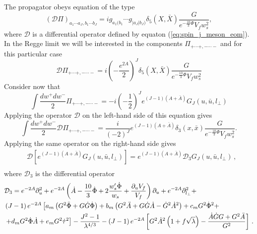 \documentclass[a4paper,12pt]{article}
\begin{document}
The propagator obeys equation of the type
\begin{equation}
\left(\mathcal{D} \Pi\right)_{a_1 \cdots a_J, b_1 \cdots b_J} = i g_{a_1(b_1} \cdots g_{|a_J|b_J)} \delta_5 \left(X, \bar{X}\right) \frac{G}{e^{-\frac{10}{3}\Phi}V_f w_s^2},
\end{equation}
where $\mathcal{D}$ is a differential operator defined by equaton (\ref{eq:spin_j_meson_eom}).
In the Regge limit we will be interested in the components $\Pi_{+\cdots+,-\cdots-}$ and for this particular case
\begin{equation}
\mathcal{D} \Pi_{+\cdots+,-\cdots-} = i {\left( - \frac{e^{2A}}{2}\right)}^J  \delta_5 \left(X, \bar{X}\right) \frac{G}{e^{-\frac{10}{3}\Phi}V_f w_s^2}
\end{equation}
Consider now that
\begin{equation}
\int \frac{dw^+ dw^-}{2} \Pi_{+\cdots+, - \cdots -} = -i {\left(-\frac{1}{2}\right)}^J e^{\left(J-1\right)(A+\bar{A})} G_J \left(u, \bar{u}, l_\perp\right)
\end{equation}
Applying the operator $\mathcal{D}$ on the left-hand side of this equation gives
\begin{equation}
\int \frac{dw^+ dw^-}{2} \mathcal{D} \Pi_{+\cdots+, - \cdots -} = \frac{i}{{\left(-2\right)}^J} e^{\left(J-1\right)\left(A+\bar{A}\right)} \delta_3\left(x, \bar{x}\right) \frac{G}{e^{-\frac{10}{3}\Phi}V_f w_s^2}.
\end{equation}
Applying the same operator on the right-hand side gives
\begin{align}
&\mathcal{D} \left[ e^{\left(J-1\right) \left(A+\bar{A}\right)} G_J \left(u, \bar{u}, l_\perp\right) \right] = e^{\left(J-1\right)\left(A+\bar{A}\right)} \mathcal{D}_3 G_J \left(u, \bar{u}, l_\perp\right) \, , \\
\end{align}
where $\mathcal{D}_3$ is the differential operator
\begin{align}
&\mathcal{D}_3 = e^{-2A} \partial_u^2 + e^{-2A} \left( \dot{A} - \frac{10}{3} \dot{\Phi} + 2 \frac{w_s' \dot{\Phi}}{w_s} + \frac{\partial_u V_f}{V_f} \right) \partial_u + e^{-2A} \partial^2_{l_\perp} +  \\
& \left(J-1\right) e^{-2A} \left[ a_m \left(G^2\ddot{\Phi} + G \dot{G} \dot{\Phi} \right) + b_m \left(G^2 \ddot{A} + G \dot{G} \dot{A} - \dot{G}^2 {\dot{A}}^2\right) + c_m G^2 {\dot{\Phi}}^2  + \right. \notag \\
& \left. + d_m  G^2 \dot{\Phi} \dot{A} + e_m G^2 {\dot{\tau}}^2 \right] - \frac{J^2-1}{\lambda^{4/3}} - \left(J-1\right) e^{-2A} \left[G^2 \dot{A}^2 \left( 1+ f \sqrt{\lambda}  \right) - \frac{\dot{A}\dot{G}G+G^2 \ddot{A}}{G^2} \right]  \, . \notag
\end{align}
\end{document}
